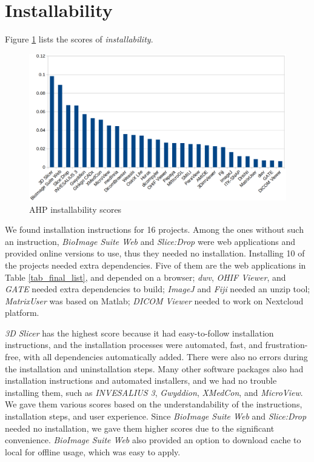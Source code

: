 \section{Installability}
\label{sec_result_installability}

Figure \ref{fg_installability_scores} lists the scores of \textit{installability}.

\begin{figure}[H]
\includegraphics[scale=0.38]{figures/installability_scores.png}
\caption{AHP installability scores}
\label{fg_installability_scores}
\end{figure}

We found installation instructions for 16 projects. Among the ones without such an instruction, \textit{BioImage Suite Web} and \textit{Slice:Drop} were web applications and provided online versions to use, thus they needed no installation. Installing 10 of the projects needed extra dependencies. Five of them are the web applications in Table \ref{tab_final_list}, and depended on a browser; \textit{dwv}, \textit{OHIF Viewer}, and \textit{GATE} needed extra dependencies to build; \textit{ImageJ} and	\textit{Fiji} needed an unzip tool; \textit{MatrixUser} was based on Matlab; \textit{DICOM Viewer} needed to work on Nextcloud platform.

\textit{3D Slicer} has the highest score because it had easy-to-follow installation instructions, and the installation processes were automated, fast, and frustration-free, with all dependencies automatically added. There were also no errors during the installation and uninstallation steps. Many other software packages also had installation instructions and automated installers, and we had no trouble installing them, such as \textit{INVESALIUS 3}, \textit{Gwyddion}, \textit{XMedCon}, and \textit{MicroView}. We gave them various scores based on the understandability of the instructions, installation steps, and user experience. Since \textit{BioImage Suite Web} and \textit{Slice:Drop} needed no installation, we gave them higher scores due to the significant convenience. \textit{BioImage Suite Web} also provided an option to download cache to local for offline usage, which was easy to apply.

